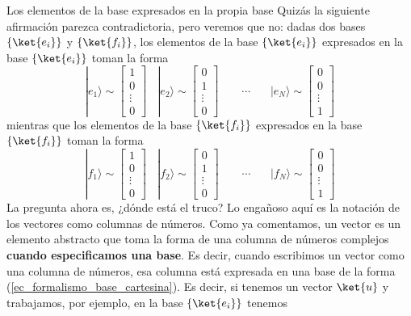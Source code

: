 \documentclass[a4paper,11pt]{book} %
\numberwithin{equation}{chapter}
\begin{document}
	\begin{mybox_blue}{Los elementos de la base expresados en la propia base}
	Quizás la siguiente afirmación parezca contradictoria, pero veremos que no: dadas dos bases $\{\ket{e_i}\}$ y $\{\ket{f_i}\}$, los elementos de la base $\{\ket{e_i}\}$ expresados en la base $\{\ket{e_i}\}$ toman la forma
		\begin{equation*}
|e_1\rangle \sim \begin{bmatrix} 1 \\ 0 \\ \vdots 
 \\ 0 \end{bmatrix}~~~~
|e_2\rangle \sim \begin{bmatrix} 0 \\ 1 \\  \vdots 
 \\ 0 \end{bmatrix}~~~~~~~~~
\cdots ~~~~~~~~
|e_N\rangle \sim \begin{bmatrix} 0 \\ 0 \\ \vdots 
 \\ 1 \end{bmatrix}
		\end{equation*}
	mientras que los elementos de la base $\{\ket{f_i}\}$ expresados en la base $\{\ket{f_i}\}$ toman la forma
		\begin{equation*}
|f_1\rangle \sim \begin{bmatrix} 1 \\ 0 \\  \vdots 
 \\ 0 \end{bmatrix}~~~~
|f_2\rangle \sim \begin{bmatrix} 0 \\ 1 \\ \vdots 
 \\ 0 \end{bmatrix}~~~~~~~~~
\cdots ~~~~~~~~
|f_N\rangle \sim \begin{bmatrix} 0 \\ 0 \\ \vdots 
 \\ 1 \end{bmatrix}
		\end{equation*}
	La pregunta ahora es, ¿dónde está el truco? Lo engañoso aquí es la notación de los vectores como columnas de números. Como ya comentamos, un vector es un elemento abstracto que toma la forma de una columna de números complejos \textbf{cuando especificamos una base}. Es decir, cuando escribimos un vector como una columna de números, esa columna está expresada en una base de la forma (\ref{ec_formalismo_base_cartesina}). Es decir, si tenemos un vector $\ket{u}$ y trabajamos, por ejemplo, en la base $\{\ket{e_i}\}$ tenemos

\end{mybox_blue}
\end{document}

